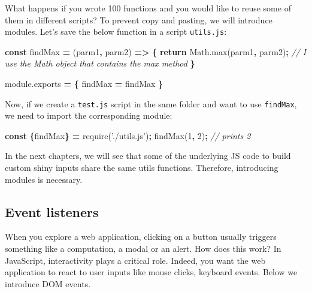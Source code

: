 \documentclass[]{book}
\newenvironment{Shaded}{\begin{snugshade}}{\end{snugshade}}
\newcommand{\AttributeTok}[1]{\textcolor[rgb]{0.77,0.63,0.00}{#1}}
\newcommand{\CommentTok}[1]{\textcolor[rgb]{0.56,0.35,0.01}{\textit{#1}}}
\newcommand{\ControlFlowTok}[1]{\textcolor[rgb]{0.13,0.29,0.53}{\textbf{#1}}}
\newcommand{\DecValTok}[1]{\textcolor[rgb]{0.00,0.00,0.81}{#1}}
\newcommand{\KeywordTok}[1]{\textcolor[rgb]{0.13,0.29,0.53}{\textbf{#1}}}
\newcommand{\NormalTok}[1]{#1}
\newcommand{\OperatorTok}[1]{\textcolor[rgb]{0.81,0.36,0.00}{\textbf{#1}}}
\newcommand{\StringTok}[1]{\textcolor[rgb]{0.31,0.60,0.02}{#1}}
\newcommand{\VariableTok}[1]{\textcolor[rgb]{0.00,0.00,0.00}{#1}}
\begin{document}
What happens if you wrote 100 functions and you would like to reuse some of them in different scripts? To prevent copy and pasting, we will introduce modules. Let's save the below function in a script \texttt{utils.js}:

\begin{Shaded}
\begin{Highlighting}[]
\KeywordTok{const}\NormalTok{ findMax }\OperatorTok{=}\NormalTok{ (parm1}\OperatorTok{,}\NormalTok{ parm2) }\OperatorTok{=>} \OperatorTok{\{}
  \ControlFlowTok{return} \VariableTok{Math}\NormalTok{.}\AttributeTok{max}\NormalTok{(parm1}\OperatorTok{,}\NormalTok{ parm2)}\OperatorTok{;} \CommentTok{// I use the Math object that contains the max method}
\OperatorTok{\}}

\VariableTok{module}\NormalTok{.}\AttributeTok{exports} \OperatorTok{=} \OperatorTok{\{}
\NormalTok{  findMax }\OperatorTok{=}\NormalTok{ findMax}
\OperatorTok{\}}
\end{Highlighting}
\end{Shaded}

Now, if we create a \texttt{test.js} script in the same folder and want to use \texttt{findMax}, we need to import the corresponding module:

\begin{Shaded}
\begin{Highlighting}[]
\KeywordTok{const} \OperatorTok{\{}\NormalTok{findMax}\OperatorTok{\}} \OperatorTok{=} \AttributeTok{require}\NormalTok{(}\StringTok{'./utils.js'}\NormalTok{)}\OperatorTok{;}
\AttributeTok{findMax}\NormalTok{(}\DecValTok{1}\OperatorTok{,} \DecValTok{2}\NormalTok{)}\OperatorTok{;} \CommentTok{// prints 2}
\end{Highlighting}
\end{Shaded}

In the next chapters, we will see that some of the underlying JS code to build custom shiny inputs share the same utils functions. Therefore, introducing modules is necessary.

\hypertarget{event-listeners}{%
\subsection{Event listeners}\label{event-listeners}}

When you explore a web application, clicking on a button usually triggers something like a computation, a modal or an alert. How does this work?
In JavaScript, interactivity plays a critical role. Indeed, you want the web application to react to user inputs like mouse clicks, keyboard events. Below we introduce DOM events.
\end{document}
